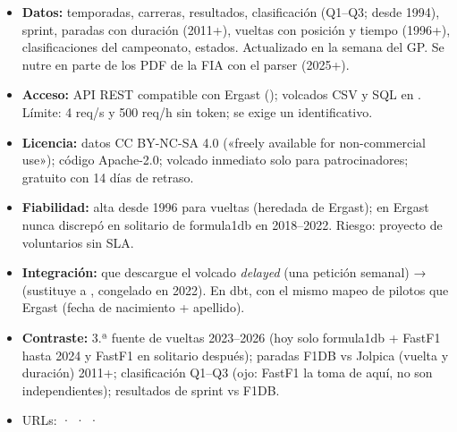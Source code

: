 \begin{itemize}
\item \textbf{Datos:} temporadas, carreras, resultados, clasificación (Q1–Q3; desde 1994), sprint, paradas con duración (2011+), vueltas con posición y tiempo (1996+), clasificaciones del campeonato, estados. Actualizado en la semana del GP. Se nutre en parte de los PDF de la FIA con el parser  (2025+).
\item \textbf{Acceso:} API REST compatible con Ergast (); volcados CSV y SQL en . Límite: 4 req/s y 500 req/h sin token; se exige un  identificativo.
\item \textbf{Licencia:} datos CC BY-NC-SA 4.0 («freely available for non-commercial use»); código Apache-2.0; volcado inmediato solo para patrocinadores; gratuito con 14 días de retraso.
\item \textbf{Fiabilidad:} alta desde 1996 para vueltas (heredada de Ergast); en  Ergast nunca discrepó en solitario de formula1db en 2018–2022. Riesgo: proyecto de voluntarios sin SLA.
\item \textbf{Integración:}  que descargue el volcado \emph{delayed} (una petición semanal) →  (sustituye a , congelado en 2022). En dbt,  con el mismo mapeo de pilotos que Ergast (fecha de nacimiento + apellido).
\item \textbf{Contraste:} 3.ª fuente de vueltas 2023–2026 (hoy solo formula1db + FastF1 hasta 2024 y FastF1 en solitario después); paradas F1DB vs Jolpica (vuelta y duración) 2011+; clasificación Q1–Q3 (ojo: FastF1 la toma de aquí, no son independientes); resultados de sprint vs F1DB.
\item URLs: \href{https://github.com/jolpica/jolpica-f1}{} · \href{https://github.com/jolpica/jolpica-f1/blob/main/TERMS.md}{} · \href{https://github.com/jolpica/jolpica-f1/blob/main/docs/rate_limits.md}{} · \href{https://github.com/jolpica/jolpica-f1/discussions/261}{}
\end{itemize}

